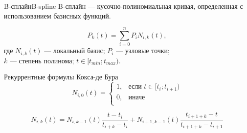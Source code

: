 \documentclass{beamer}
\begin{document}
	\begin{frame}{B-сплайн}{B-spline}
		B-сплайн  --- кусочно-полиномиальная кривая, определенная с использованием базисных функций.

		\[
			P_k(t) = \sum_{i=0}^{n} P_i N_{i, k} (t)
			,	
		\]
		где 
		$N_{i,k}(t)$ --- локальный базис;
		$P_i$ --- узловые точки;
		\\ $k$ --- степень полинома;
		$t \in  [t_{min}; t_{max})$.

		

		Рекуррентные формулы Кокса-де Бура %
		\[
		N_{i,0} (t) =
		\begin{cases}
			1, & \text{если~} t \in  [t_{i}; t_{i+1}) \\
			0, & \text{иначе} \\
		\end{cases}	
		\]

		\[
			N_{i,k} (t) =
			N_{i,k-1} (t)
			\frac{t - t_i}{t_{i+k} - t_i} 
			+
			N_{i+1,k-1} (t)
			\frac{t_{i+1+k} - t}{t_{i+1+k} - t_{i+1}} 
		\]


\end{frame}
\end{document}
